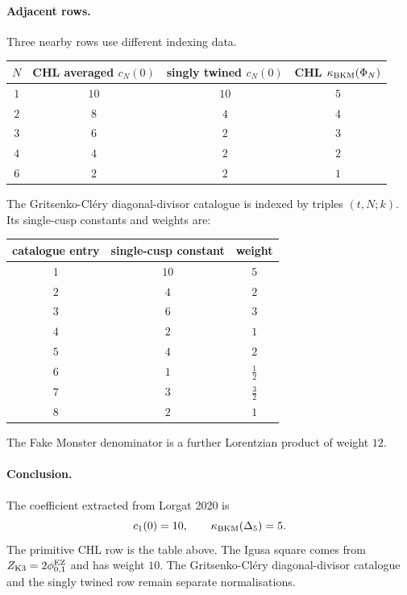 \paragraph{Adjacent rows.}
Three nearby rows use different indexing data.
\begin{center}
\begin{tabular}{c|c|c|c}
\hline
$N$ & CHL averaged $c_N(0)$ & singly twined $c_N(0)$ & CHL $\kappa_{\mathrm{BKM}}(\Phi_N)$\\
\hline
$1$ & $10$ & $10$ & $5$\\
$2$ & $8$ & $4$ & $4$\\
$3$ & $6$ & $2$ & $3$\\
$4$ & $4$ & $2$ & $2$\\
$6$ & $2$ & $2$ & $1$\\
\hline
\end{tabular}
\end{center}
The Gritsenko-Cl\'ery diagonal-divisor catalogue is indexed by triples
$(t,N;k)$.  Its single-cusp constants and weights are:
\begin{center}
\begin{tabular}{c|c|c}
\hline
catalogue entry & single-cusp constant & weight\\
\hline
$1$ & $10$ & $5$\\
$2$ & $4$ & $2$\\
$3$ & $6$ & $3$\\
$4$ & $2$ & $1$\\
$5$ & $4$ & $2$\\
$6$ & $1$ & $\tfrac12$\\
$7$ & $3$ & $\tfrac32$\\
$8$ & $2$ & $1$\\
\hline
\end{tabular}
\end{center}
The Fake Monster denominator is a further Lorentzian product of weight
$12$.

\paragraph{Conclusion.}
The coefficient extracted from Lorgat 2020 is
\[
 c_1(0)=10,\qquad \kappa_{\mathrm{BKM}}(\Delta_5)=5 .
\]
The primitive CHL row is the table above.  The Igusa square comes from
$Z_{\mathrm{K3}}=2\phi_{0,1}^{\mathrm{EZ}}$ and has weight $10$.  The Gritsenko-Cl\'ery
diagonal-divisor catalogue and the singly twined row remain separate
normalisations.

